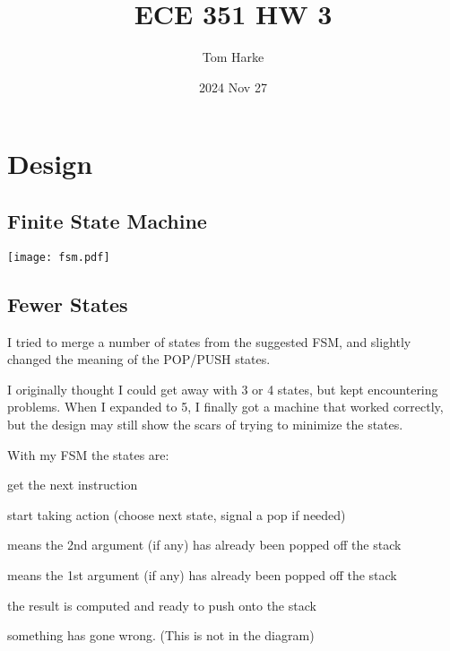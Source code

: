 \documentclass{article}
\title{ECE 351 HW 3}
\date{2024 Nov 27}
\author{Tom Harke}
\begin{document}
\maketitle


\section{Design}
\subsection{Finite State Machine}
\texttt{[image: fsm.pdf]}
\subsection{Fewer States}
I tried to merge a number of states from the suggested FSM,
and slightly changed the meaning of the POP/PUSH states.

I originally thought I could get away with 3 or 4 states, but kept encountering problems.
When I expanded to 5,
I finally got a machine that worked correctly, but the design may still show the scars of trying to minimize the states.


With my FSM the states are:
\begin{description}[noitemsep]
\item[FETCH:]  get the next instruction
\item[DECODE:] start taking action (choose next state, signal a pop if needed)
\item[POP2:]   means the 2nd argument (if any) has already been popped off the stack
\item[POP1:]   means the 1st argument (if any) has already been popped off the stack
\item[PUSH:]   the result is computed and ready to push onto the stack
\item[ERROR:]  something has gone wrong. (This is not in the diagram)
\end{description}


%
%
\end{document}
